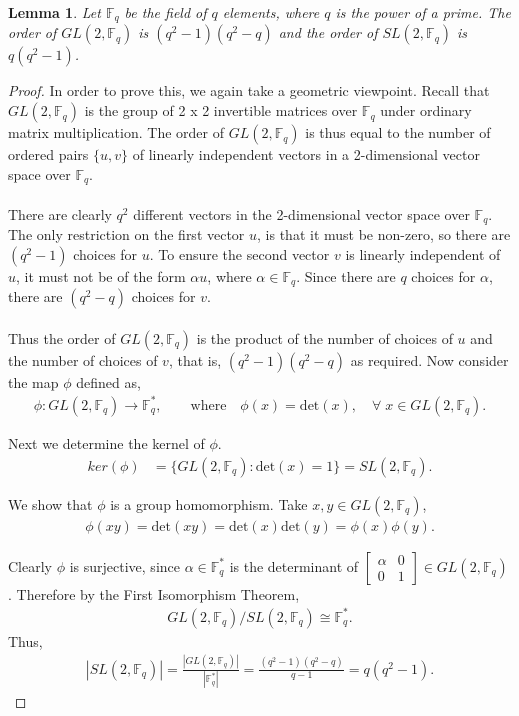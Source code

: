 \documentclass[a4paper , 11pt]{book}
\newtheorem{lemma}[theorem]{Lemma}
\theoremstyle{definition}
\theoremstyle{remark}
\begin{document}
\begin{lemma}\label{ordersl2q} Let $\mathbb{F}_q$ be the field of $q$ elements, where $q$ is the power of a prime. The order of $GL(2,\mathbb{F}_q)$ is $(q^2-1)(q^2-q)$ and the order of $SL(2,\mathbb{F}_q)$ is $q(q^2-1)$.
\end{lemma}

\begin{proof} In order to prove this, we again take a geometric viewpoint. Recall that $GL(2,\mathbb{F}_q)$ is the group of 2 x 2 invertible matrices over $\mathbb{F}_q$ under ordinary matrix multiplication. The order of $GL(2,\mathbb{F}_q)$ is thus equal to the number of ordered pairs $\{u,v\}$ of linearly independent vectors in a 2-dimensional vector space over $\mathbb{F}_q$. \\
\\
There are clearly $q^2$ different vectors in the 2-dimensional vector space over $\mathbb{F}_q$. The only restriction on the first vector $u$, is that it must be non-zero, so there are $(q^2 - 1)$ choices for $u$. To ensure the second vector $v$ is linearly independent of $u$, it must not be of the form $\alpha u$, where $\alpha \in \mathbb{F}_q$. Since there are $q$ choices for $\alpha$, there are $(q^2-q)$ choices for $v$. \\
\\
Thus the order of $GL(2,\mathbb{F}_q)$ is the product of the number of choices of $u$ and the number of choices of $v$, that is, $(q^2-1)(q^2-q)$ as required. Now consider the map $\phi$ defined as,
\begin{align*} \phi : GL(2,\mathbb{F}_q) \longrightarrow \mathbb{F}^*_q, \qquad \text{where} \quad \! \! \phi(x) = \text{det}(x), \quad \forall \; x \in GL(2,\mathbb{F}_q).
\end{align*}

Next we determine the kernel of $\phi$.
\begin{align*} ker(\phi) &= \{  GL(2,\mathbb{F}_q) : \text{det}(x) = 1 \} = SL(2,\mathbb{F}_q).
\end{align*}

We show that $\phi$ is a group homomorphism. Take $x,y \in GL(2,\mathbb{F}_q)$,
\begin{align*} \phi(xy) = \text{det}(xy) = \text{det}(x) \text{det}(y) = \phi(x) \phi(y).
\end{align*}

Clearly $\phi$ is surjective, since $\alpha \in \mathbb{F}^*_q$ is the determinant of $\begin{bmatrix} \alpha & 0 \\ 0 & 1 \end{bmatrix} \in GL(2,\mathbb{F}_q)$. Therefore by the First Isomorphism Theorem,
\begin{align*} GL(2,\mathbb{F}_q) / SL(2,\mathbb{F}_q) \cong \mathbb{F}^*_q.
\end{align*}
Thus,
\begin{align*} |SL(2,\mathbb{F}_q)| =  \frac{|GL(2,\mathbb{F}_q)|}{|\mathbb{F}^*_q|} = \frac{(q^2-1)(q^2-q)}{q-1} = q(q^2-1).
\end{align*}

\end{proof}
\end{document}

